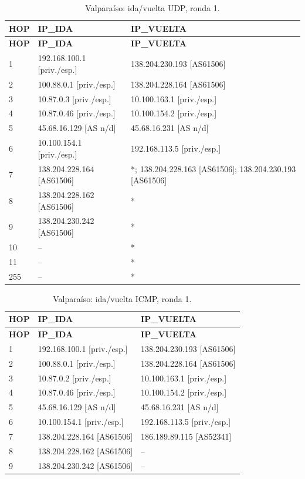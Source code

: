 \begin{longtable}{p{0.95cm}p{7.075cm}p{7.075cm}}
\caption{Valparaíso: ida/vuelta UDP, ronda 1.}\label{anexo:vuelta:138.204.230.242:UDP:1} \\
\toprule
\textbf{HOP} & \textbf{IP\_\allowbreak{}IDA} & \textbf{IP\_\allowbreak{}VUELTA} \\ \midrule
\endfirsthead
\toprule
\textbf{HOP} & \textbf{IP\_\allowbreak{}IDA} & \textbf{IP\_\allowbreak{}VUELTA} \\ \midrule
\endhead
1 & 192.168.100.1 [priv./esp.] & 138.204.230.193 [AS61506] \\
2 & 100.88.0.1 [priv./esp.] & 138.204.228.164 [AS61506] \\
3 & 10.87.0.3 [priv./esp.] & 10.100.163.1 [priv./esp.] \\
4 & 10.87.0.46 [priv./esp.] & 10.100.154.2 [priv./esp.] \\
5 & 45.68.16.129 [AS n/d] & 45.68.16.231 [AS n/d] \\
6 & 10.100.154.1 [priv./esp.] & 192.168.113.5 [priv./esp.] \\
7 & 138.204.228.164 [AS61506] & *; 138.204.228.163 [AS61506]; 138.204.230.193 [AS61506] \\
8 & 138.204.228.162 [AS61506] & * \\
9 & 138.204.230.242 [AS61506] & * \\
10 & -- & * \\
11 & -- & * \\
255 & -- & * \\
\bottomrule
\end{longtable}
\endgroup
\begingroup
\fontsize{9}{11}\selectfont
\begin{longtable}{p{0.95cm}p{7.075cm}p{7.075cm}}
\caption{Valparaíso: ida/vuelta ICMP, ronda 1.}\label{anexo:vuelta:138.204.230.242:ICMP:1} \\
\toprule
\textbf{HOP} & \textbf{IP\_\allowbreak{}IDA} & \textbf{IP\_\allowbreak{}VUELTA} \\ \midrule
\endfirsthead
\toprule
\textbf{HOP} & \textbf{IP\_\allowbreak{}IDA} & \textbf{IP\_\allowbreak{}VUELTA} \\ \midrule
\endhead
1 & 192.168.100.1 [priv./esp.] & 138.204.230.193 [AS61506] \\
2 & 100.88.0.1 [priv./esp.] & 138.204.228.164 [AS61506] \\
3 & 10.87.0.2 [priv./esp.] & 10.100.163.1 [priv./esp.] \\
4 & 10.87.0.46 [priv./esp.] & 10.100.154.2 [priv./esp.] \\
5 & 45.68.16.129 [AS n/d] & 45.68.16.231 [AS n/d] \\
6 & 10.100.154.1 [priv./esp.] & 192.168.113.5 [priv./esp.] \\
7 & 138.204.228.164 [AS61506] & 186.189.89.115 [AS52341] \\
8 & 138.204.228.162 [AS61506] & -- \\
9 & 138.204.230.242 [AS61506] & -- \\
\bottomrule
\end{longtable}

